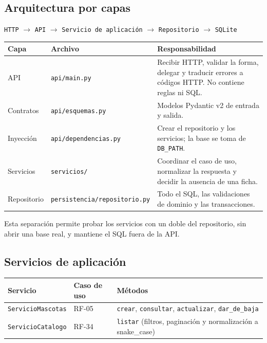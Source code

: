 \documentclass[11pt,a4paper]{article}
\newcommand{\code}[1]{\texttt{#1}}
\newcommand{\thead}[1]{\textbf{#1}}
\begin{document}
\subsection{Arquitectura por capas}

\begin{center}
\code{HTTP} $\rightarrow$ \code{API} $\rightarrow$
\code{Servicio de aplicación} $\rightarrow$ \code{Repositorio} $\rightarrow$
\code{SQLite}
\end{center}

{\footnotesize
\begin{tabularx}{\linewidth}{@{}V{0.55}V{1.05}V{1.4}@{}}
\toprule
\thead{Capa} & \thead{Archivo} & \thead{Responsabilidad} \\ \midrule
API & \code{api/main.py} & Recibir HTTP, validar la forma, delegar y traducir
errores a códigos HTTP. No contiene reglas ni SQL. \\
Contratos & \code{api/esquemas.py} & Modelos Pydantic v2 de entrada y salida. \\
Inyección & \code{api/dependencias.py} & Crear el repositorio y los servicios;
la base se toma de \code{DB\_PATH}. \\
Servicios & \code{servicios/} & Coordinar el caso de uso, normalizar la
respuesta y decidir la ausencia de una ficha. \\
Repositorio & \code{persistencia/repositorio.py} & Todo el SQL, las validaciones
de dominio y las transacciones. \\
\bottomrule
\end{tabularx}
}

Esta separación permite probar los servicios con un doble del repositorio, sin
abrir una base real, y mantiene el SQL fuera de la API.

\subsection{Servicios de aplicación}

{\footnotesize
\begin{tabularx}{\linewidth}{@{}V{0.7}V{0.8}V{1.5}@{}}
\toprule
\thead{Servicio} & \thead{Caso de uso} & \thead{Métodos} \\ \midrule
\code{ServicioMascotas} & RF-05 &
\code{crear}, \code{consultar}, \code{actualizar}, \code{dar\_de\_baja} \\
\code{ServicioCatalogo} & RF-34 &
\code{listar} (filtros, paginación y normalización a snake\_case) \\
\bottomrule
\end{tabularx}
}
\end{document}
